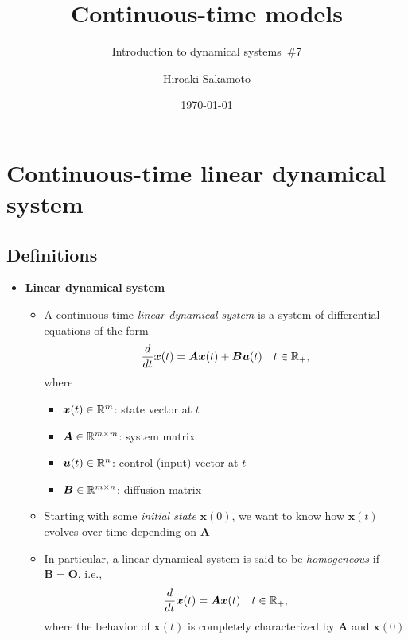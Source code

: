 \documentclass[12pt,a4paper]{article}
\title{Continuous-time models}
\subtitle{Introduction to dynamical systems~\#7}
\author{Hiroaki Sakamoto}
\date{\today}
\begin{document}
\maketitle
\tableofcontents

\section{Continuous-time linear dynamical system}

\subsection{Definitions}

\begin{itemize}

\item \textbf{Linear dynamical system}
  \begin{itemize}
  \item A continuous-time \emph{linear dynamical system} is a system of differential equations of the form
    \begin{equation}\nonumber%
      \frac{d}{dt}\bm{x}(t) = \bm{A}\bm{x}(t) + \bm{B}\bm{u}(t)
      \quad t \in \R_{+},
    \end{equation}
    where
    \begin{itemize}
    \item $\bm{x}(t)\in \mathbb{R}^{m}$: state vector at $t$
    \item $\bm{A}\in \mathbb{R}^{m\times m}$: system matrix
    \item $\bm{u}(t)\in \mathbb{R}^{n}$: control (input) vector at $t$
    \item $\bm{B} \in \mathbb{R}^{m\times n}$: diffusion matrix
    \end{itemize}
  \item Starting with some \emph{initial state} $\bm{x}(0)$, we want to know how $\bm{x}(t)$ evolves over time depending on $\bm{A}$
  \item In particular, a linear dynamical system is said to be \emph{homogeneous} if $\bm{B}=\bm{O}$, i.e.,
    \begin{equation}\nonumber%
      \frac{d}{dt}\bm{x}(t) = \bm{A}\bm{x}(t)
      \quad t \in \R_{+},
    \end{equation}
    where the behavior of $\bm{x}(t)$ is completely characterized by $\bm{A}$ and $\bm{x}(0)$
  \end{itemize}


\end{itemize}
\end{document}
